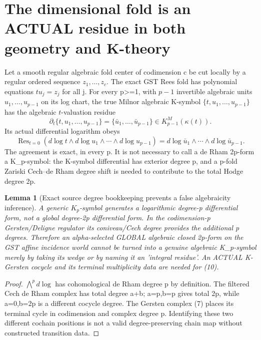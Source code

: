 \documentclass[11pt]{article}
\newtheorem{lemma}[theorem]{Lemma}
\begin{document}
\section{The dimensional fold is an ACTUAL residue in both geometry and K-theory}
Let a smooth regular algebraic fold center of codimension c
be cut locally by a regular ordered sequence
$z_1,\ldots,z_c$.
The exact GST Rees fold has polynomial equations
$t u_j=z_j$ for all j.
For every p>=1, with $p-1$ invertible algebraic units
$u_1,\ldots,u_{p-1}$ on its log chart,
the true Milnor algebraic K-symbol
$\{t,u_1,\ldots,u_{p-1}\}$ has the algebraic
$t$-valuation residue
\[
 \boxed{
 \partial_t\{t,u_1,\ldots,u_{p-1}\}
        =\{\bar u_1,\ldots,\bar u_{p-1}\}
        \in K^M_{p-1}(\kappa(t)).
 }                                                       \tag{11}
\]
Its actual differential logarithm obeys
\[
 \boxed{
 \operatorname{Res}_{t=0}
 (d\log t\wedge d\log u_1\wedge\cdots
             \wedge d\log u_{p-1})
 =d\log\bar u_1\wedge\cdots\wedge
                   d\log\bar u_{p-1}.
 }                                                       \tag{12}
\]
The agreement is exact, in every p.
It is not necessary to call a de Rham 2p-form a K_p-symbol:
the K-symbol differential has exterior degree p, and
a p-fold Zariski Cech--de Rham degree shift is needed
to contribute to the total Hodge degree 2p.

\begin{lemma}[Exact source degree bookkeeping prevents a false algebraicity inference]
A generic $K_p$-symbol generates a logarithmic
degree-p differential form, not a global
degree-2p differential form. In the codimension-p
Gersten/Deligne regulator its coniveau/Cech degree
provides the additional p degrees.
Therefore an alpha-selected GLOBAL algebraic
closed 2p-form on the GST affine incidence
world cannot be turned into a genuine algebraic
K_p-symbol merely by taking its wedge or by
naming it an 'integral residue'.
An ACTUAL K-Gersten cocycle and its terminal
multiplicity data are needed for (10).
\end{lemma}
\begin{proof}
$\bigwedge^p d\log$ has cohomological de Rham
degree p by definition. The filtered Cech
de Rham complex has total degree a+b;
a=p,b=p gives total 2p, while a=0,b=2p
is a different cocycle degree. The Gersten
complex (7) places its terminal cycle in
codimension and complex degree p.
Identifying these two different cochain
positions is not a valid degree-preserving
chain map without constructed transition data.
\end{proof}
\end{document}
